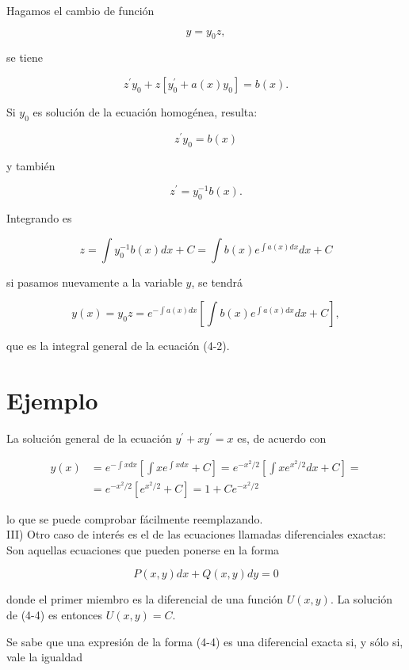 \documentclass[10pt]{article}
\theoremstyle{plain}
\theoremstyle{definition}
\theoremstyle{remark}
\begin{document}
Hagamos el cambio de función

$$
y=y_{0} z,
$$

se tiene

$$
z^{\prime} y_{0}+z\left[y_{0}^{\prime}+a(x) y_{0}\right]=b(x) .
$$

Si $y_{0}$ es solución de la ecuación homogénea, resulta:

$$
z^{\prime} y_{0}=b(x)
$$

y también

$$
z^{\prime}=y_{0}^{-1} b(x) .
$$

Integrando es

$$
z=\int y_{0}^{-1} b(x) d x+C=\int b(x) e^{\int a(x) d x} d x+C
$$

si pasamos nuevamente a la variable $y$, se tendrá


\begin{equation*}
y(x)=y_{0} z=e^{-\int a(x) d x}\left[\int b(x) e^{\int a(x) d x} d x+C\right], \tag{4-3}
\end{equation*}


que es la integral general de la ecuación (4-2).

\section*{Ejemplo}
La solución general de la ecuación $y^{\prime}+x y^{\prime}=x$ es, de acuerdo con

$$
\begin{aligned}
y(x) & =e^{-\int x d x}\left[\int x e^{\int x d x}+C\right]=e^{-x^{2} / 2}\left[\int x e^{x^{2} / 2} d x+C\right]= \\
& =e^{-x^{2} / 2}\left[e^{x^{2} / 2}+C\right]=1+C e^{-x^{2} / 2}
\end{aligned}
$$

lo que se puede comprobar fácilmente reemplazando.\\
III) Otro caso de interés es el de las ecuaciones llamadas diferenciales exactas: Son aquellas ecuaciones que pueden ponerse en la forma


\begin{equation*}
P(x, y) d x+Q(x, y) d y=0 \tag{4-4}
\end{equation*}


donde el primer miembro es la diferencial de una función $U(x, y)$. La solución de (4-4) es entonces $U(x, y)=C$.

Se sabe que una expresión de la forma (4-4) es una diferencial exacta si, y sólo si, vale la igualdad
\end{document}
